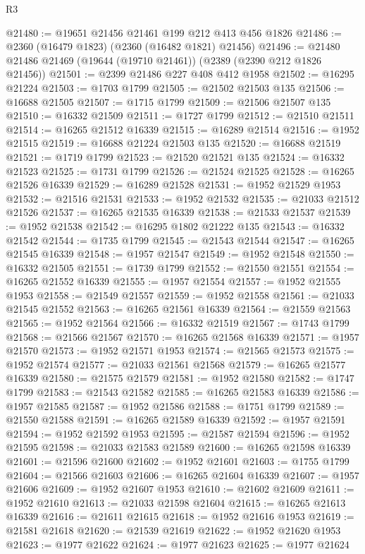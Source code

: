 \begin{lexlean}{R3}
\begin{coremodule}
@21480 := @19651 @21456 @21461 @199 @212 @413 @456 @1826
@21486 := @2360 (@16479 @1823) (@2360 (@16482 @1821) @21456)
@21496 := @21480 @21486 @21469 (@19644 (@19710 @21461)) (@2389 (@2390 @212 @1826 @21456))
@21501 := @2399 @21486 @227 @408 @412 @1958
@21502 := @16295 @21224
@21503 := @1703 @1799
@21505 := @21502 @21503 @135
@21506 := @16688 @21505
@21507 := @1715 @1799
@21509 := @21506 @21507 @135
@21510 := @16332 @21509
@21511 := @1727 @1799
@21512 := @21510 @21511
@21514 := @16265 @21512 @16339
@21515 := @16289 @21514
@21516 := @1952 @21515
@21519 := @16688 @21224 @21503 @135
@21520 := @16688 @21519
@21521 := @1719 @1799
@21523 := @21520 @21521 @135
@21524 := @16332 @21523
@21525 := @1731 @1799
@21526 := @21524 @21525
@21528 := @16265 @21526 @16339
@21529 := @16289 @21528
@21531 := @1952 @21529 @1953
@21532 := @21516 @21531
@21533 := @1952 @21532
@21535 := @21033 @21512 @21526
@21537 := @16265 @21535 @16339
@21538 := @21533 @21537
@21539 := @1952 @21538
@21542 := @16295 @1802 @21222 @135
@21543 := @16332 @21542
@21544 := @1735 @1799
@21545 := @21543 @21544
@21547 := @16265 @21545 @16339
@21548 := @1957 @21547
@21549 := @1952 @21548
@21550 := @16332 @21505
@21551 := @1739 @1799
@21552 := @21550 @21551
@21554 := @16265 @21552 @16339
@21555 := @1957 @21554
@21557 := @1952 @21555 @1953
@21558 := @21549 @21557
@21559 := @1952 @21558
@21561 := @21033 @21545 @21552
@21563 := @16265 @21561 @16339
@21564 := @21559 @21563
@21565 := @1952 @21564
@21566 := @16332 @21519
@21567 := @1743 @1799
@21568 := @21566 @21567
@21570 := @16265 @21568 @16339
@21571 := @1957 @21570
@21573 := @1952 @21571 @1953
@21574 := @21565 @21573
@21575 := @1952 @21574
@21577 := @21033 @21561 @21568
@21579 := @16265 @21577 @16339
@21580 := @21575 @21579
@21581 := @1952 @21580
@21582 := @1747 @1799
@21583 := @21543 @21582
@21585 := @16265 @21583 @16339
@21586 := @1957 @21585
@21587 := @1952 @21586
@21588 := @1751 @1799
@21589 := @21550 @21588
@21591 := @16265 @21589 @16339
@21592 := @1957 @21591
@21594 := @1952 @21592 @1953
@21595 := @21587 @21594
@21596 := @1952 @21595
@21598 := @21033 @21583 @21589
@21600 := @16265 @21598 @16339
@21601 := @21596 @21600
@21602 := @1952 @21601
@21603 := @1755 @1799
@21604 := @21566 @21603
@21606 := @16265 @21604 @16339
@21607 := @1957 @21606
@21609 := @1952 @21607 @1953
@21610 := @21602 @21609
@21611 := @1952 @21610
@21613 := @21033 @21598 @21604
@21615 := @16265 @21613 @16339
@21616 := @21611 @21615
@21618 := @1952 @21616 @1953
@21619 := @21581 @21618
@21620 := @21539 @21619
@21622 := @1952 @21620 @1953
@21623 := @1977 @21622
@21624 := @1977 @21623
@21625 := @1977 @21624

\end{coremodule}
\end{lexlean}
